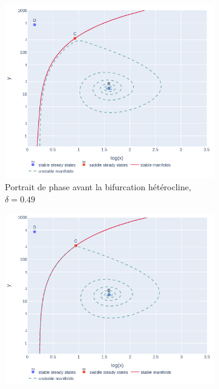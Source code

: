 \documentclass[12pt]{article}
\begin{document}
\begin{figure}[!ht]
    \centering
    \begin{subfigure}[b]{0.4\textwidth}
         \centering
         \includegraphics[width=\textwidth]{figures/fig_heteroclinic_before.png}
         \caption{Portrait de phase avant la bifurcation hétérocline, $\delta = 0.49$}
         \label{fig::heteroclinic_bifurcation_a}
     \end{subfigure}\hfill
     \begin{subfigure}[b]{0.4\textwidth}
         \centering
         \includegraphics[width=\textwidth]{figures/fig_heteroclinic.png}

\end{subfigure}
\end{figure}
\end{document}
